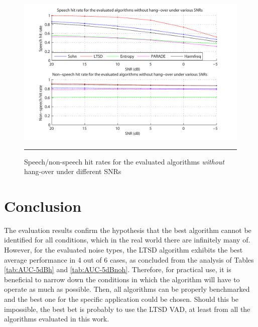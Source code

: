 \begin{figure}[htbp]
	\centering
		\includegraphics[width=0.9\columnwidth]{Figures/Chapter4/snrnoh.pdf}
		\rule{37em}{0.5pt}
	\caption[Speech/non-speech hit rates for the evaluated algorithms \emph{without} hang-over under different SNRs]{Speech/non-speech hit rates for the evaluated algorithms \emph{without} hang-over under different SNRs}
	\label{fig:snrnoh}
\end{figure}


\section{Conclusion}

The evaluation results confirm the hypothesis that the best algorithm cannot be identified for all conditions, which in the real world there are infinitely many of. However, for the evaluated noise types, the LTSD algorithm exhibits the best average performance in 4 out of 6 cases, as concluded from the analysis of Tables \ref{tab:AUC-5dBh} and \ref{tab:AUC-5dBnoh}. Therefore, for practical use, it is beneficial to narrow down the conditions in which the algorithm will have to operate as much as possible. Then, all algorithms can be properly benchmarked and the best one for the specific application could be chosen. Should this be impossible, the best bet is probably to use the LTSD VAD, at least from all the algorithms evaluated in this work.